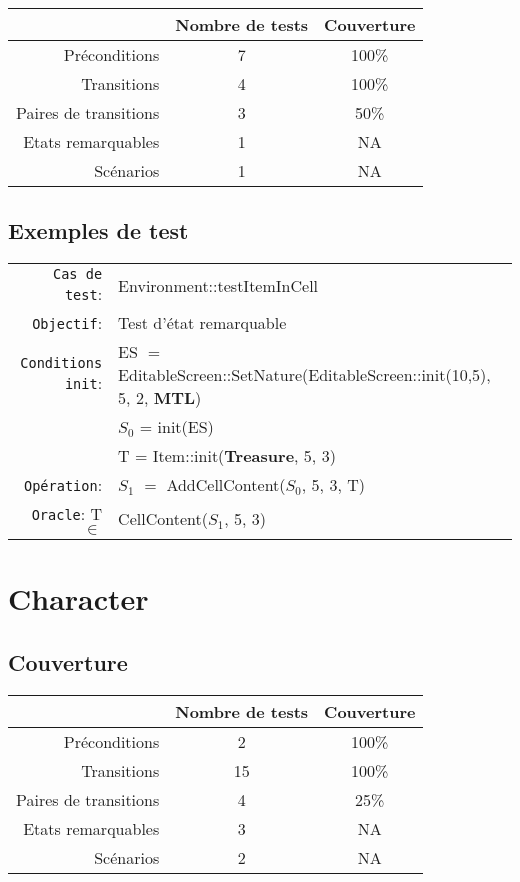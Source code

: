 \documentclass{article}
\begin{document}
\begin{longtable}{r|cc}
  &Nombre de tests&Couverture\\
  \hline
  Préconditions & 7 & 100\%\\
  Transitions & 4 & 100\%\\
  Paires de transitions & 3 & 50\%\\
  Etats remarquables & 1 & NA\\
  Scénarios & 1 & NA\\
\end{longtable}

\subsection{Exemples de test}

{\small
  \begin{longtable}{rl}
    \texttt{Cas de test}: &\textrm{Environment::testItemInCell}\\
    \texttt{Objectif}: & Test d'état remarquable \\
    \texttt{Conditions init}: & ES $=$ \textrm{EditableScreen::SetNature(EditableScreen::init(10,5), 5, 2, \textbf{MTL})}\\
    & $S_0$ = \textrm{init(ES)}\\
    & T = \textrm{Item::init(\textbf{Treasure}, 5, 3)}\\
    \texttt{Opération}: &$S_1$ $=$ \textrm{AddCellContent($S_0$, 5, 3, T)}\\
    \texttt{Oracle}: T $\in$ &\textrm{CellContent($S_1$, 5, 3)}\\
  \end{longtable}}

\section{Character}

\subsection{Couverture}

\begin{longtable}{r|cc}
  &Nombre de tests&Couverture\\
  \hline
  Préconditions & 2 & 100\%\\
  Transitions & 15 & 100\%\\
  Paires de transitions & 4 & 25\%\\
  Etats remarquables & 3 & NA\\
  Scénarios & 2 & NA\\
\end{longtable}
\end{document}
